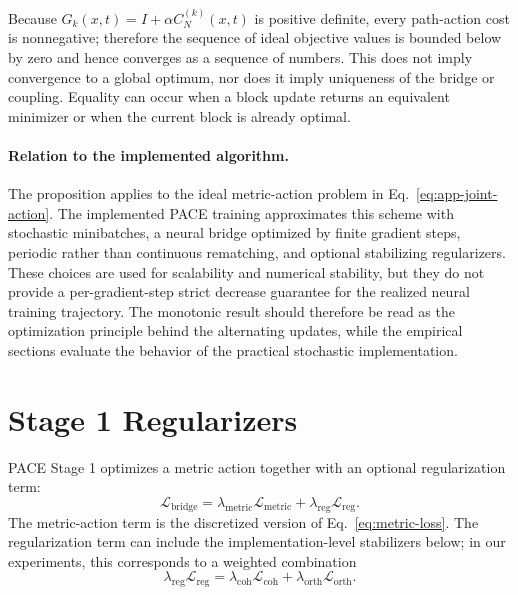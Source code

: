 Because \(G_k(x,t)=I+\alpha C_N^{(k)}(x,t)\) is positive definite, every path-action cost is nonnegative; therefore the sequence of ideal objective values is bounded below by zero and hence converges as a sequence of numbers. This does not imply convergence to a global optimum, nor does it imply uniqueness of the bridge or coupling. Equality can occur when a block update returns an equivalent minimizer or when the current block is already optimal.

\paragraph{Relation to the implemented algorithm.}
The proposition applies to the ideal metric-action problem in Eq.~\eqref{eq:app-joint-action}. The implemented PACE training approximates this scheme with stochastic minibatches, a neural bridge optimized by finite gradient steps, periodic rather than continuous rematching, and optional stabilizing regularizers. These choices are used for scalability and numerical stability, but they do not provide a per-gradient-step strict decrease guarantee for the realized neural training trajectory. The monotonic result should therefore be read as the optimization principle behind the alternating updates, while the empirical sections evaluate the behavior of the practical stochastic implementation.

\section{Stage 1 Regularizers}
\label{app:regularizers}

PACE Stage 1 optimizes a metric action together with an optional regularization term:
\begin{equation}
  \mathcal{L}_{\mathrm{bridge}}
  =
  \lambda_{\mathrm{metric}}\mathcal{L}_{\mathrm{metric}}
  +
  \lambda_{\mathrm{reg}}\mathcal{L}_{\mathrm{reg}}.
\end{equation}
The metric-action term is the discretized version of Eq.~\eqref{eq:metric-loss}. The regularization term can include the implementation-level stabilizers below; in our experiments, this corresponds to a weighted combination
\[
  \lambda_{\mathrm{reg}}\mathcal{L}_{\mathrm{reg}}
  =
  \lambda_{\mathrm{coh}}\mathcal{L}_{\mathrm{coh}}
  +
  \lambda_{\mathrm{orth}}\mathcal{L}_{\mathrm{orth}}.
\]

